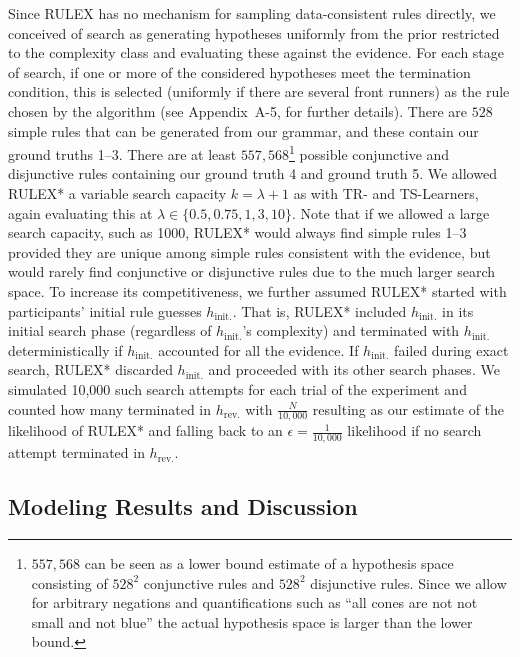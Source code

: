 \documentclass[doc,natbib,floatsintext]{apa7}
\newcommand{\hr}{h_{\mathrm{rev.}}}
\newcommand{\hi}{h_{\mathrm{init.}}}
\begin{document}
Since RULEX has no mechanism for sampling data-consistent rules directly, we conceived of search as generating hypotheses uniformly from the prior restricted to the complexity class and evaluating these against the evidence. For each stage of search, if one or more of the considered hypotheses meet the termination condition, this is selected (uniformly if there are several front runners) as the rule chosen by the algorithm (see Appendix~A-5, for further details). There are $528$ simple rules that can be generated from our grammar, and these contain our ground truths 1--3. There are at least $557,568$\footnote{$557,568$ can be seen as a lower bound estimate of a hypothesis space consisting of $528^2$ conjunctive rules and $528^2$ disjunctive rules. Since we allow for arbitrary negations and quantifications such as ``all cones are not not small and not blue'' the actual hypothesis space is larger than the lower bound.} possible conjunctive and disjunctive rules containing our ground truth 4 and ground truth 5. We allowed RULEX* a variable search capacity $k = \lambda +1 $ as with TR- and TS-Learners, again evaluating this at $\lambda \in \{0.5, 0.75, 1, 3, 10\}$. Note that if we allowed a large search capacity, such as 1000, RULEX* would always find simple rules 1--3 provided they are unique among simple rules consistent with the evidence, but would rarely find conjunctive or disjunctive rules due to the much larger search space. To increase its competitiveness, we further assumed RULEX* started with participants' initial rule guesses $\hi$. That is, RULEX* included $\hi$ in its initial search phase (regardless of $\hi$'s complexity) and terminated with $\hi$ deterministically if $\hi$ accounted for all the evidence. If $\hi$ failed during exact search, RULEX* discarded $\hi$ and proceeded with its other search phases. We simulated 10,000 such search attempts for each trial of the experiment and counted how many terminated in $\hr$ with $\frac{N}{10,000}$ resulting as our estimate of the likelihood of RULEX* and falling back to an $\epsilon=\frac{1}{10,000}$ likelihood if no search attempt terminated in $\hr$.



\subsection{Modeling Results and Discussion}
\end{document}
